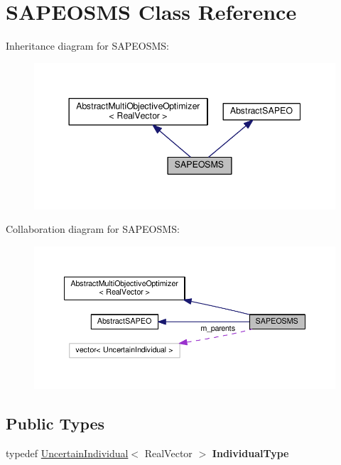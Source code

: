 \hypertarget{classSAPEOSMS}{}\section{S\+A\+P\+E\+O\+S\+MS Class Reference}
\label{classSAPEOSMS}


Inheritance diagram for S\+A\+P\+E\+O\+S\+MS\+:\nopagebreak
\begin{figure}[H]
\begin{center}
\leavevmode
\includegraphics[width=344pt]{classSAPEOSMS__inherit__graph}
\end{center}
\end{figure}


Collaboration diagram for S\+A\+P\+E\+O\+S\+MS\+:\nopagebreak
\begin{figure}[H]
\begin{center}
\leavevmode
\includegraphics[width=350pt]{classSAPEOSMS__coll__graph}
\end{center}
\end{figure}
\subsection*{Public Types}
\begin{DoxyCompactItemize}
\item 
typedef \hyperlink{classUncertainIndividual}{Uncertain\+Individual}$<$ Real\+Vector $>$ {\bfseries Individual\+Type}\hypertarget{classSAPEOSMS_a0b8e726bd43a3ed09470f73571dc079a}{}\label{classSAPEOSMS_a0b8e726bd43a3ed09470f73571dc079a}

\end{DoxyCompactItemize}
